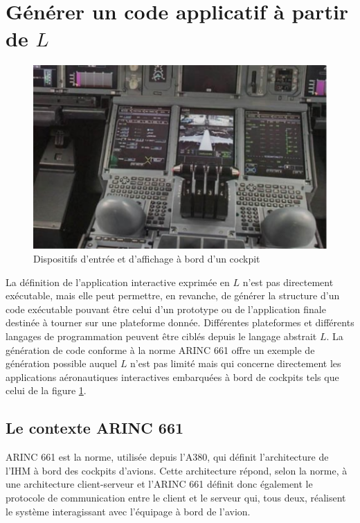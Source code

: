 \documentclass{ihm}
\begin{document}
\section{Générer un code applicatif à partir de $L$}

\begin{figure}[t!] 
\begin{center}
\includegraphics [scale = 0.5]{cockpit}
\end{center}
\caption{Dispositifs d'entrée et d'affichage à bord d'un cockpit}
\label{fig:cockpit} 
\end{figure}

La définition de  l'application interactive exprimée en  $L$ n'est pas
directement  exécutable, mais  elle  peut permettre,  en revanche,  de
générer  la structure  d'un code  exécutable pouvant  être celui  d'un
prototype  ou  de l'application  finale  destinée  à tourner  sur  une
plateforme donnée.  Différentes plateformes  et différents langages de
programmation peuvent être ciblés depuis  le langage abstrait $L$.  La
génération de code conforme à la norme ARINC 661 \cite{ARINC} offre un
exemple de  génération possible auquel  $L$ n'est pas limité  mais qui
concerne  directement  les   applications  aéronautiques  interactives
embarquées  à   bord  de  cockpits   tels  que  celui  de   la  figure
\ref{fig:cockpit}.

\subsection{Le contexte ARINC 661}

ARINC  661  est   la  norme,  utilisée  depuis   l'A380,  qui  définit
l'architecture  de   l'IHM  à  bord  des   cockpits  d'avions.   Cette
architecture répond, selon la norme, à une architecture client-serveur
et l'ARINC  661 définit donc  également le protocole  de communication
entre le  client et le  serveur qui,  tous deux, réalisent  le système
interagissant avec l'équipage à bord de l'avion.
\end{document}
